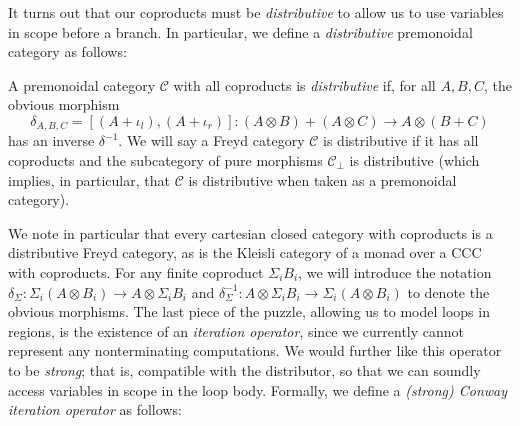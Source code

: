 \documentclass[acmsmall,screen,review]{acmart}
\newcommand{\mc}[1]{\ensuremath{\mathcal{#1}}}
\begin{document}
It turns out that our coproducts must be \emph{distributive} to allow us to use variables in scope
before a branch. In particular, we define a \emph{distributive} premonoidal category as follows:
\begin{definition}
  A premonoidal category $\mc{C}$ with all coproducts is \emph{distributive} if, for all $A, B, C$,
  the obvious morphism
  $$
  \delta_{A, B, C} 
    = [(A + \iota_l), (A + \iota_r)] : (A \otimes B) + (A \otimes C) \to A \otimes (B + C)
  $$
  has an inverse $\delta^{-1}$. 
  We will say a Freyd category $\mc{C}$ is distributive if it has all coproducts and the subcategory
  of pure morphisms $\mc{C}_\bot$ is distributive (which implies, in particular, that $\mc{C}$ is
  distributive when taken as a premonoidal category).
\end{definition}
We note in particular that every cartesian closed category with coproducts is a distributive Freyd
category, as is the Kleisli category of a monad over a CCC with coproducts. 
%
For any finite coproduct $\Sigma_iB_i$, we will introduce the notation $\delta_{\Sigma} : \Sigma_i
(A \otimes B_i) \to A \otimes \Sigma_i B_i$ and $\delta_{\Sigma}^{-1} : A \otimes \Sigma_i B_i \to
\Sigma_i (A \otimes B_i)$ to denote the obvious morphisms.
%
The last piece of the puzzle, allowing us to model loops in regions, is the existence of an
\emph{iteration operator}, since we currently cannot represent any nonterminating computations. We
would further like this operator to be \emph{strong}; that is, compatible with the distributor, so
that we can soundly access variables in scope in the loop body. Formally, we define a \emph{(strong)
Conway iteration operator} as follows:
\end{document}
